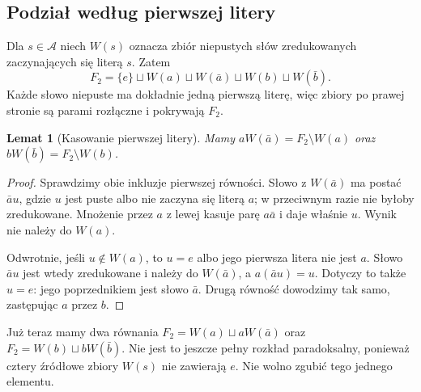 \documentclass[11pt,a4paper]{article}
\numberwithin{equation}{section}
\theoremstyle{plain}
\newtheorem{lemat}[twierdzenie]{Lemat}
\theoremstyle{definition}
\theoremstyle{remark}
\begin{document}
\subsection{Podział według pierwszej litery}
Dla $s\in\mathcal A$ niech $W(s)$ oznacza zbiór niepustych słów zredukowanych zaczynających się literą $s$. Zatem
\begin{equation}\label{eq:4-1}
 F_2=\{e\}\sqcup W(a)\sqcup W(\bar a)\sqcup W(b)\sqcup W(\bar b).
\end{equation}
Każde słowo niepuste ma dokładnie jedną pierwszą literę, więc zbiory po prawej stronie są parami rozłączne i pokrywają $F_2$.
\begin{lemat}[Kasowanie pierwszej litery]\label{lem:pierwsza-litera}
Mamy $aW(\bar a)=F_2\setminus W(a)$ oraz $bW(\bar b)=F_2\setminus W(b)$.
\end{lemat}
\begin{proof}
Sprawdzimy obie inkluzje pierwszej równości. Słowo z $W(\bar a)$ ma postać $\bar au$, gdzie $u$ jest puste albo nie zaczyna się literą $a$; w przeciwnym razie nie byłoby zredukowane. Mnożenie przez $a$ z lewej kasuje parę $a\bar a$ i daje właśnie $u$. Wynik nie należy do $W(a)$.

Odwrotnie, jeśli $u\notin W(a)$, to $u=e$ albo jego pierwsza litera nie jest $a$. Słowo $\bar au$ jest wtedy zredukowane i należy do $W(\bar a)$, a $a(\bar au)=u$. Dotyczy to także $u=e$: jego poprzednikiem jest słowo $\bar a$. Drugą równość dowodzimy tak samo, zastępując $a$ przez $b$.
\end{proof}
Już teraz mamy dwa równania $F_2=W(a)\sqcup aW(\bar a)$ oraz $F_2=W(b)\sqcup bW(\bar b)$. Nie jest to jeszcze pełny rozkład paradoksalny, ponieważ cztery źródłowe zbiory $W(s)$ nie zawierają $e$. Nie wolno zgubić tego jednego elementu.
\end{document}
